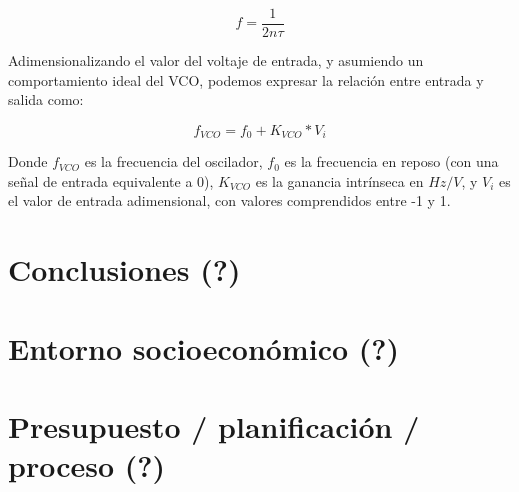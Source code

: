 \documentclass[12pt]{report} %
\begin{document}
	\begin{figure}[h]
		\begin{equation}
		\label{vco-freq-sw-t}
		f = \frac{1}{2 n \tau}
		\end{equation}
		\footnotemark
	\end{figure}
	
	Adimensionalizando el valor del voltaje de entrada, y asumiendo un comportamiento ideal del VCO, podemos expresar la relación entre entrada y salida como:
	\begin{figure}[h]
		\begin{equation}
		\label{vco-freq-ideal}
		f_{VCO}= f_{0} + K_{VCO} * V_{i}
		\end{equation}
		\footnotemark
	\end{figure}
	
	Donde $f_{VCO}$ es la frecuencia del oscilador, $f_{0}$ es la frecuencia en reposo (con una señal de entrada equivalente a 0), $K_{VCO}$ es la ganancia intrínseca en $Hz/V$, y $V_{i}$ es el valor de entrada adimensional, con valores comprendidos entre -1 y 1.
	
	
	
	
	
	

	

\chapter{Conclusiones (?)}
\chapter{Entorno socioeconómico (?)}
\chapter{Presupuesto / planificación / proceso (?)}


\nocite{*} %

\clearpage


\printbibliography


\end{document}
